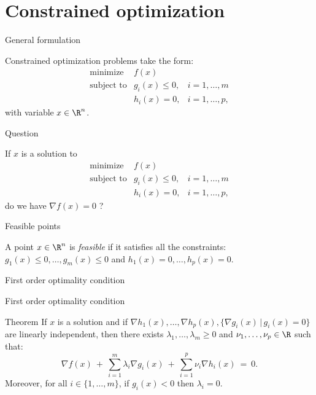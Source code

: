 \documentclass{beamer}
\begin{document}
\section{Constrained optimization}

\begin{frame}[t]{General formulation}
	\grid

	Constrained optimization problems take the form:
	$$
	\begin{array}{lll}
		\text{minimize} & f(x) & \\
		\text{subject to} & g_i(x) \leq 0, & i=1, \dots, m \\
						  & h_i(x) = 0, & i=1, \dots, p,
	\end{array}
	$$
	with variable $x \in \R^n$.
\end{frame}

\begin{frame}[t]{Question}
	\grid

	If $x$ is a solution to
	$$
		\begin{array}{lll}
			\text{minimize} & f(x) & \\
			\text{subject to} & g_i(x) \leq 0, & i=1, \dots, m \\
							  & h_i(x) = 0, & i=1, \dots, p,
		\end{array}
		$$
	do we have $\nabla f(x) = 0$ ?
\end{frame}

\begin{frame}[t]{Feasible points}
	\grid
	\begin{definition}
		A point $x \in \R^n$ is \emph{feasible} if it satisfies all the constraints: $g_1(x) \leq 0, \dots, g_m(x)\leq  0$ and $h_1(x) = 0, \dots, h_p(x) = 0$. 
	\end{definition}


\end{frame}

\begin{frame}[t]{First order optimality condition}
	\grid

	\pause
	\pause
	\pause
\end{frame}

\begin{frame}[t]{First order optimality condition}
	\grid

	\vspace{-0.4cm}
	\begin{block}{Theorem}
		If $x$ is a solution and if $\nabla h_1(x), \dots, \nabla h_p(x), \{\nabla g_i(x) \, | \, g_i(x) = 0 \}$ are linearly independent,
		then there exists $\lambda_1, \dots, \lambda_m \geq 0$ and $\nu_1, \dots, \nu_p \in \R$ such that:
		\begin{equation}\label{eq:kkt1}
			\nabla f(x) \ + \ \sum_{i=1}^m \lambda_i \nabla g_i(x) \ + \ \sum_{i=1}^p \nu_i \nabla h_i(x)  \ = \ 0.
		\end{equation}
		Moreover, for all  $i\in \{1, \dots, m\}$, if $g_i(x) < 0$ then $\lambda_i = 0$.
	\end{block}

\end{frame}
\end{document}
